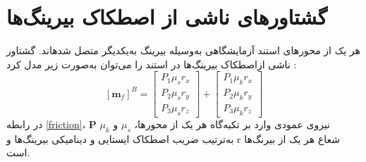 \section{گشتاورهای ناشی از اصطكاک بیرينگ‌ها}
هر یک از محورهای استند آزمایشگاهی به‌وسیله بیرینگ به‌یکدیگر متصل شدهاند. گشتاور ناشی ازاصطکاک بیرینگ‌ها در استند را می‌توان به‌صورت زیر مدل کرد
\cite{Arabolye}
:
\begin{equation}\label{friction}
	[\boldsymbol m_f]^B = \begin{bmatrix}
		P_1\mu_sr_x \\
		P_2\mu_sr_y \\
		P_3\mu_sr_z
	\end{bmatrix} + \begin{bmatrix}
	P_1\mu_kr_x \\
	P_2\mu_kr_y \\
	P_3\mu_kr_z
\end{bmatrix}
\end{equation}
در رابطه \ref{friction}، $\boldsymbol P$ نیروی عمودی وارد بر تکیه‌گاه هر یک از محورها، $\mu_s$ و $\mu_k$ به‌ترتیب ضریب اصطکاک
ایستایی و دینامیکی بیرینگ‌ها و r شعاع هر یک از بیرنگ‌ها است.
